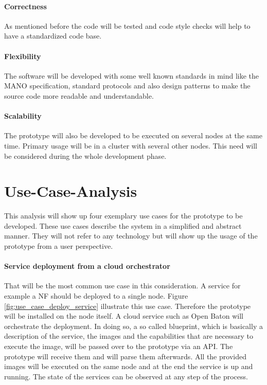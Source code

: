 \paragraph{Correctness} As mentioned before the code will be tested and code style checks will help to have a standardized code base.
\paragraph{Flexibility} The software will be developed with some well known standards in mind like the \ac{MANO} specification, standard protocols and also design patterns to make the source code more readable and understandable.
\paragraph{Scalability} The prototype will also be developed to be executed on several nodes at the same time.
Primary usage will be in a cluster with several other nodes.
This need will be considered during the whole development phase.


\section{Use-Case-Analysis}
\label{section:use-case-analysis}
This analysis will show up four exemplary use cases for the prototype to be developed.
These use cases describe the system in a simplified and abstract manner.
They will not refer to any technology but will show up the usage of the prototype from a user perspective.

\paragraph{Service deployment from a cloud orchestrator}
That will be the most common use case in this consideration.
A service for example a \ac{NF} should be deployed to a single node.
Figure \ref{fig:use_case_deploy_service} illustrate this use case.
Therefore the prototype will be installed on the node itself.
A cloud service such as Open Baton will orchestrate the deployment.
In doing so, a so called blueprint, which is basically a description of the service, the images and the capabilities that are necessary to execute the image, will be passed over to the prototype via an \ac{API}.
The prototype will receive them and will parse them afterwards.
All the provided images will be executed on the same node and at the end the service is up and running.
The state of the services can be observed at any step of the process.

